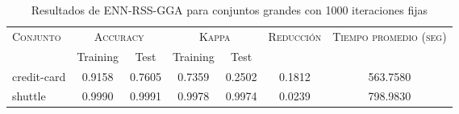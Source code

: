 \begin{table}[]
\centering
\begin{tabular}{l c c c c c c}
\hline
\multirow{2}{*}{\textsc{Conjunto}}
	& \multicolumn{2}{c}{\textsc{Accuracy}}
	& \multicolumn{2}{c}{\textsc{Kappa}}
	& \textsc{Reducción}
	& \textsc{Tiempo promedio (seg)} \\
	& Training & Test
	& Training & Test \\ 
\hline
\hline

credit-card & 0.9158 & 0.7605 & 0.7359 & 0.2502 & 0.1812 & 563.7580 \\
shuttle & 0.9990 & 0.9991 & 0.9978 & 0.9974 & 0.0239 & 798.9830 \\

\hline
\end{tabular}
\caption{Resultados de ENN-RSS-GGA para conjuntos grandes con 1000 iteraciones fijas}
\label{res-grande-enn-rss-gga}
\end{table}

\clearpage


